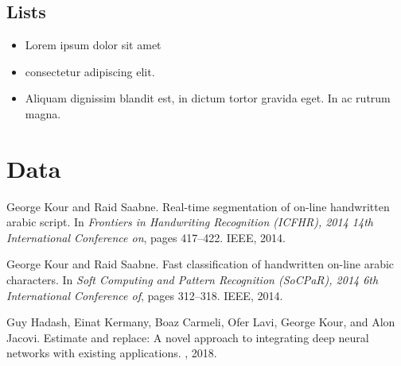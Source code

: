 \documentclass{article}
\begin{document}
	\subsection{Lists}
	\begin{itemize}
		\item Lorem ipsum dolor sit amet
		\item consectetur adipiscing elit. 
		\item Aliquam dignissim blandit est, in dictum tortor gravida eget. In ac rutrum magna.
	\end{itemize}
	
	
	\section{Data}
	
	
	  
	
	
	\begin{thebibliography}{1}
		
		George Kour and Raid Saabne.
		\newblock Real-time segmentation of on-line handwritten arabic script.
		\newblock In {\em Frontiers in Handwriting Recognition (ICFHR), 2014 14th
			International Conference on}, pages 417--422. IEEE, 2014.
		
		George Kour and Raid Saabne.
		\newblock Fast classification of handwritten on-line arabic characters.
		\newblock In {\em Soft Computing and Pattern Recognition (SoCPaR), 2014 6th
			International Conference of}, pages 312--318. IEEE, 2014.
		
		Guy Hadash, Einat Kermany, Boaz Carmeli, Ofer Lavi, George Kour, and Alon
		Jacovi.
		\newblock Estimate and replace: A novel approach to integrating deep neural
		networks with existing applications.
		, 2018.
		
	\end{thebibliography}
	
	
\end{document}
